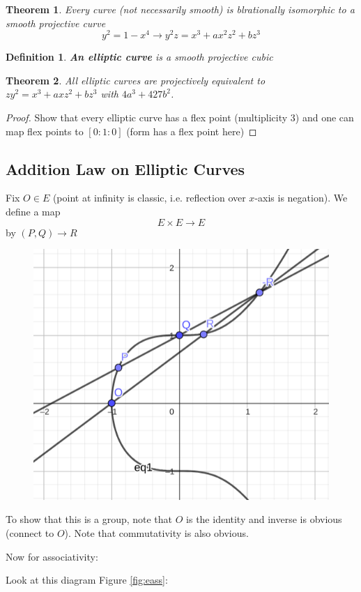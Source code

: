 \documentclass[12pt]{article}
\newtheorem{definition}{Definition}[section]
\newtheorem{theorem}{Theorem}[section]
\begin{document}
\begin{theorem}
Every curve (not necessarily smooth) is blrationally isomorphic to a smooth projective curve
\[
y^2=1-x^4 \rightarrow y^2 z=x^3+a x^2 z^2+b z^3
\]
\end{theorem}

\begin{definition}
	\textbf{An elliptic curve} is a smooth projective cubic
\end{definition}

\begin{theorem}
All elliptic curves are projectively equivalent to $z y^2=x^3+a x z^2+b z^3$ with $4 a^3+4 27b^2$.
\end{theorem}

\begin{proof}
Show that every elliptic curve has a flex point (multiplicity 3) and one can map flex points to $[0:1:0]$ (form has a flex point here)
\end{proof}

\subsection{Addition Law on Elliptic Curves}

Fix $O \in E $ (point at infinity is classic, i.e. reflection over $x$-axis is negation).
We define a map
\[
	E \times E \to E
\]
by $(P,Q) \to R $

\begin{figure}[ht]
	\centering
	\includegraphics[width=.4\textwidth]{eadd}
\end{figure}
\newpage

To show that this is a group, note that $O $ is the identity and inverse is obvious (connect to $O $).
Note that commutativity is also obvious.

Now for associativity:

Look at this diagram Figure \ref{fig:eass}:
\end{document}
